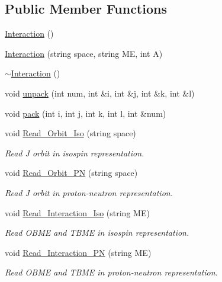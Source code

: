 \subsection*{Public Member Functions}
\begin{DoxyCompactItemize}
\item 
\hyperlink{class_interaction_a1590aded9946d5afaa3ae5a2f77b1933}{Interaction} ()
\item 
\hyperlink{class_interaction_a3579f62f4d43a48f62dab8b5ca560941}{Interaction} (string space, string M\-E, int A)
\item 
\hyperlink{class_interaction_a3d1a04c8afff080d7e9409d59a96efba}{$\sim$\-Interaction} ()
\item 
void \hyperlink{class_interaction_a906559736b06d72e49244436e8dfad0d}{unpack} (int num, int \&i, int \&j, int \&k, int \&l)
\item 
void \hyperlink{class_interaction_a68bde2a8a674f54a8f42cd992e96b907}{pack} (int i, int j, int k, int l, int \&num)
\item 
void \hyperlink{class_interaction_a5215914c0464c733a6c140a814b48513}{Read\-\_\-\-Orbit\-\_\-\-Iso} (string space)
\begin{DoxyCompactList}\small\item\em Read J orbit in isospin representation. \end{DoxyCompactList}\item 
void \hyperlink{class_interaction_a6df2e9326e87a957cf6efd63e3188cf7}{Read\-\_\-\-Orbit\-\_\-\-P\-N} (string space)
\begin{DoxyCompactList}\small\item\em Read J orbit in proton-\/neutron representation. \end{DoxyCompactList}\item 
void \hyperlink{class_interaction_a467419c63d4d647ad219f7b46b6afed5}{Read\-\_\-\-Interaction\-\_\-\-Iso} (string M\-E)
\begin{DoxyCompactList}\small\item\em Read O\-B\-M\-E and T\-B\-M\-E in isospin representation. \end{DoxyCompactList}\item 
void \hyperlink{class_interaction_a96b36b6eab380437ba94585a5ac2a31b}{Read\-\_\-\-Interaction\-\_\-\-P\-N} (string M\-E)
\begin{DoxyCompactList}\small\item\em Read O\-B\-M\-E and T\-B\-M\-E in proton-\/neutron representation. \end{DoxyCompactList}\item 

\end{DoxyCompactItemize}
